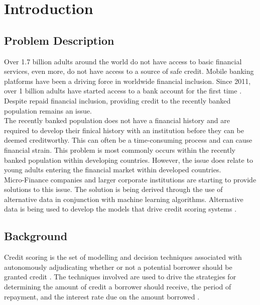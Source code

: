 \chapter{Introduction} 
\label{Chapter1}

\section{Problem Description}

Over 1.7 billion adults around the world do not have access to basic financial services, even more, do not have access to a source of safe credit. Mobile banking platforms have been a driving force in worldwide financial inclusion. Since 2011, over 1 billion adults have started access to a bank account for the first time \parencite{WorldBank}. Despite repaid financial inclusion, providing credit to the recently banked population remains an issue. \\

The recently banked population does not have a financial history and are required to develop their finical history with an institution before they can be deemed creditworthy. This can often be a time-consuming process and can cause financial strain. This problem is most commonly occurs within the recently banked population within developing countries. However, the issue does relate to young adults entering the financial market within developed countries. \\

Micro-Finance companies and larger corporate institutions are starting to provide solutions to this issue. The solution is being derived through the use of alternative data in conjunction with machine learning algorithms. Alternative data is being used to develop the models that drive credit scoring systems \parencite{BigDataMicroFiance}. 


\section{Background}

Credit scoring is the set of modelling and decision techniques associated with autonomously adjudicating whether or not a potential borrower should be granted credit \parencite{PerceptronScoring}. The techniques involved are used to drive the strategies for determining the amount of credit a borrower  should receive, the period of repayment, and the interest rate due on the amount borrowed \parencite{CreditRiskSummary}. \\

